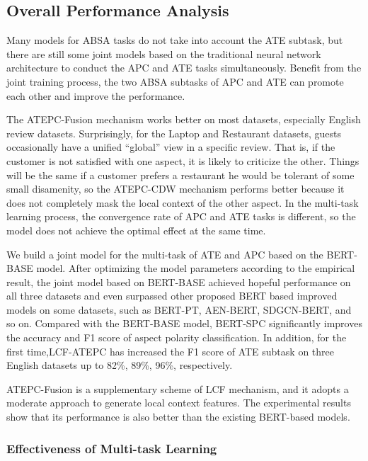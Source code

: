 \documentclass[a4paper,fleqn]{cas-sc}
\begin{document}
\subsection{Overall Performance Analysis}

Many models for ABSA tasks do not take into account the ATE subtask, but there are still some joint models \cite{nguyen2018joint} based on the traditional neural network architecture to conduct the APC and ATE tasks simultaneously. Benefit from the joint training process, the two ABSA subtasks of APC and ATE can promote each other and improve the performance.

The ATEPC-Fusion mechanism works better on most datasets, especially English review datasets.
Surprisingly, for the Laptop and Restaurant datasets, guests occasionally have a unified ``global'' view in a specific review. That is, if the customer is not satisfied with one aspect, it is likely to criticize the other. Things will be the same if a customer prefers a restaurant he would be tolerant of some small disamenity, so the ATEPC-CDW mechanism performs better because it does not completely mask the local context of the other aspect. In the multi-task learning process, the convergence rate of APC and ATE tasks is different, so the model does not achieve the optimal effect at the same time. 

We build a joint model for the multi-task of ATE and APC based on the BERT-BASE model. After optimizing the model parameters according to the empirical result, the joint model based on BERT-BASE achieved hopeful performance on all three datasets and even surpassed other proposed BERT based improved models on some datasets, such as BERT-PT, AEN-BERT, SDGCN-BERT, and so on. 
Compared with the BERT-BASE model, BERT-SPC significantly improves the accuracy and F1 score of aspect polarity classification. In addition, for the first time,LCF-ATEPC has increased the F1 score of ATE subtask on three English datasets up to 82\%, 89\%, 96\%, respectively.

ATEPC-Fusion is a supplementary scheme of LCF mechanism, and it adopts a moderate approach to generate local context features. The experimental results show that its performance is also better than the existing BERT-based models.

\subsubsection{Effectiveness of Multi-task Learning}
\end{document}
